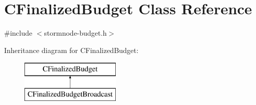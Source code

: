 \hypertarget{class_c_finalized_budget}{}\section{C\+Finalized\+Budget Class Reference}
\label{class_c_finalized_budget}


{\ttfamily \#include $<$stormnode-\/budget.\+h$>$}

Inheritance diagram for C\+Finalized\+Budget\+:\begin{figure}[H]
\begin{center}
\leavevmode
\includegraphics[height=2.000000cm]{class_c_finalized_budget}
\end{center}
\end{figure}
